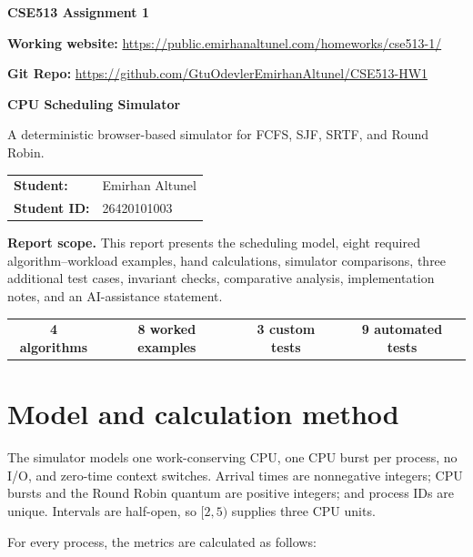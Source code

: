 \documentclass[11pt,a4paper]{article}
\newcommand{\websiteurl}{https://public.emirhanaltunel.com/homeworks/cse513-1/}
\newcommand{\giturl}{https://github.com/GtuOdevlerEmirhanAltunel/CSE513-HW1}
\newcommand{\studentname}{Emirhan Altunel}
\newcommand{\studentid}{26420101003}
\begin{document}
{\large\bfseries\color{accent} CSE513 Assignment 1}\par
\vspace{3pt}
\textbf{Working website: }\href{\websiteurl}{\websiteurl}\par
\textbf{Git Repo: }\href{\giturl}{\giturl}\par
\vspace{16mm}

{\Huge\bfseries\color{ink} CPU Scheduling Simulator}\par
\vspace{6mm}
{\large A deterministic browser-based simulator for FCFS, SJF, SRTF, and Round Robin.}\par
\vspace{15mm}

\begin{tabular}{@{}ll@{}}
  \textbf{Student:}    & \studentname \\
  \textbf{Student ID:} & \studentid   \\
\end{tabular}

\vfill
\colorbox{softblue}{\parbox{0.92\linewidth}{
    \textbf{Report scope.} This report presents the scheduling model, eight required
    algorithm--workload examples, hand calculations, simulator comparisons, three
    additional test cases, invariant checks, comparative analysis, implementation
    notes, and an AI-assistance statement.
  }}
\vfill
\begin{center}
  \begin{tabular}{cccc}
    \textbf{4 algorithms} & \textbf{8 worked examples} & \textbf{3 custom tests} & \textbf{9 automated tests}
  \end{tabular}
\end{center}
\newpage

\tableofcontents
\newpage

\section{Model and calculation method}

The simulator models one work-conserving CPU, one CPU burst per process, no I/O,
and zero-time context switches. Arrival times are nonnegative integers; CPU bursts
and the Round Robin quantum are positive integers; and process IDs are unique.
Intervals are half-open, so $[2,5)$ supplies three CPU units.

For every process, the metrics are calculated as follows:
\end{document}
